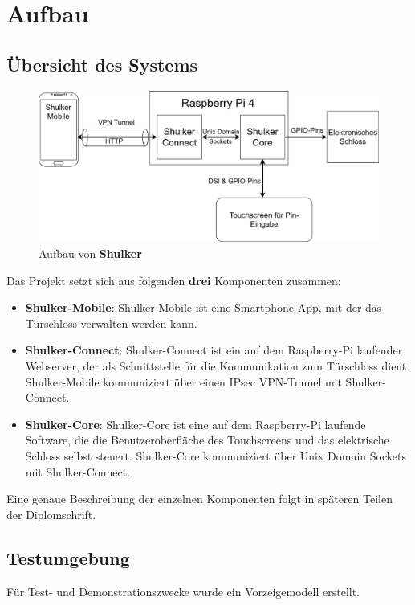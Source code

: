 \chapter{Aufbau}

\section{Übersicht des Systems}


\begin{figure}[H]
	\begin{center}
		\includegraphics[width=1\textwidth]{images/Intro/Leitbild.png}
		\caption{Aufbau von \textbf{Shulker}}
	\end{center}
\end{figure}

Das Projekt setzt sich aus folgenden \textbf{drei} Komponenten zusammen:


\begin{itemize}
    \item \textbf{Shulker-Mobile}: Shulker-Mobile ist eine Smartphone-App, mit der das Türschloss verwalten werden kann.
    \item \textbf{Shulker-Connect}: Shulker-Connect ist ein auf dem Raspberry-Pi laufender Webserver, der als Schnittstelle für die Kommunikation zum Türschloss dient. Shulker-Mobile kommuniziert über einen IPsec VPN-Tunnel mit Shulker-Connect.
    \item \textbf{Shulker-Core}: Shulker-Core ist eine auf dem Raspberry-Pi laufende Software, die die Benutzeroberfläche des Touchscreens und das elektrische Schloss selbst steuert. Shulker-Core kommuniziert über Unix Domain Sockets mit Shulker-Connect.
\end{itemize}

Eine genaue Beschreibung der einzelnen Komponenten folgt in späteren Teilen der Diplomschrift. 

\section{Testumgebung}

Für Test- und Demonstrationszwecke wurde ein Vorzeigemodell erstellt.
